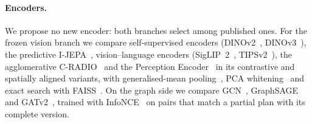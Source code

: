 \paragraph{Encoders.}
We propose no new encoder: both branches select among published ones.
For the frozen vision branch we compare self-supervised encoders (DINOv2~\cite{oquab2024dinov2}, DINOv3~\cite{simeoni2025dinov3}), the predictive I-JEPA~\cite{assran2023ijepa}, vision--language encoders (SigLIP~2~\cite{tschannen2025siglip2}, TIPSv2~\cite{cao2026tipsv2}), the agglomerative C-RADIO~\cite{ranzinger2024amradio} and the Perception Encoder~\cite{bolya2025perception} in its contrastive and spatially aligned variants, with generalised-mean pooling~\cite{radenovic2019gem}, PCA whitening~\cite{jegou2012whitening} and exact search with FAISS~\cite{douze2025faiss}.
On the graph side we compare GCN~\cite{kipf2017gcn}, GraphSAGE~\cite{hamilton2017graphsage} and GATv2~\cite{brody2022gatv2}, trained with InfoNCE~\cite{oord2019cpc} on pairs that match a partial plan with its complete version.

